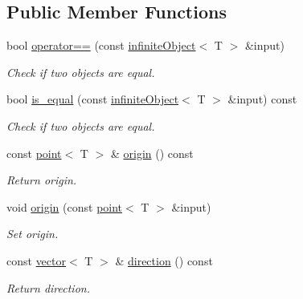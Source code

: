 \subsection*{Public Member Functions}
\begin{DoxyCompactItemize}
\item 
bool \hyperlink{classddd_1_1infinite_object_a7cd3342d60d4de4e4fc91d90fa9cc065}{operator==} (const \hyperlink{classddd_1_1infinite_object}{infinite\+Object}$<$ T $>$ \&input)
\begin{DoxyCompactList}\small\item\em Check if two objects are equal. \end{DoxyCompactList}\item 
bool \hyperlink{classddd_1_1infinite_object_a64089c7dadb2ec0b414b155f5bd43339}{is\+\_\+equal} (const \hyperlink{classddd_1_1infinite_object}{infinite\+Object}$<$ T $>$ \&input) const
\begin{DoxyCompactList}\small\item\em Check if two objects are equal. \end{DoxyCompactList}\item 
\mbox{\label{classddd_1_1infinite_object_a0097f1df7ea358d410a73bdfcf2904f9}} 
const \hyperlink{classddd_1_1point}{point}$<$ T $>$ \& \hyperlink{classddd_1_1infinite_object_a0097f1df7ea358d410a73bdfcf2904f9}{origin} () const
\begin{DoxyCompactList}\small\item\em Return origin. \end{DoxyCompactList}\item 
void \hyperlink{classddd_1_1infinite_object_a82ecd5fc09ecfe5b1fe9a2609dd1465e}{origin} (const \hyperlink{classddd_1_1point}{point}$<$ T $>$ \&input)
\begin{DoxyCompactList}\small\item\em Set origin. \end{DoxyCompactList}\item 
\mbox{\label{classddd_1_1infinite_object_a7197d400db3804be122c78475c242a00}} 
const \hyperlink{classddd_1_1vector}{vector}$<$ T $>$ \& \hyperlink{classddd_1_1infinite_object_a7197d400db3804be122c78475c242a00}{direction} () const
\begin{DoxyCompactList}\small\item\em Return direction. \end{DoxyCompactList}\item 

\end{DoxyCompactItemize}
